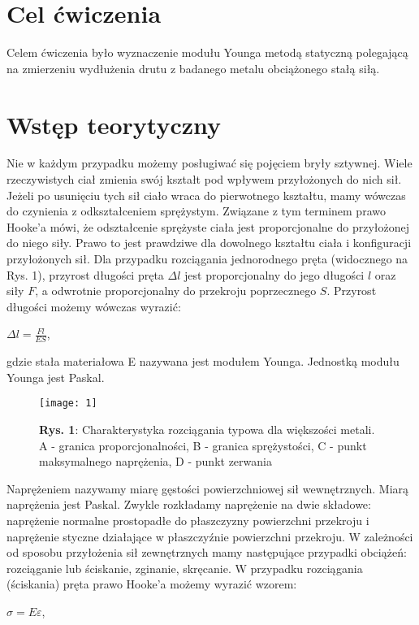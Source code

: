 \documentclass[12pt]{article}
\begin{document}
\tableofcontents \newpage
\section{Cel ćwiczenia}
Celem ćwiczenia było wyznaczenie modułu Younga metodą statyczną polegającą na zmierzeniu wydłużenia drutu z badanego metalu obciążonego stałą siłą.
\section{Wstęp teorytyczny}
\noindent Nie w każdym przypadku możemy posługiwać się pojęciem bryły sztywnej. Wiele rzeczywistych ciał zmienia swój kształt pod wpływem przyłożonych do nich sił. 
Jeżeli po usunięciu tych sił ciało wraca do pierwotnego kształtu, mamy wówczas do czynienia z odkształceniem sprężystym. Związane z tym terminem prawo 
Hooke'a mówi, że odształcenie sprężyste ciała jest proporcjonalne do przyłożonej do niego siły. Prawo to jest prawdziwe dla dowolnego kształtu ciała i konfiguracji 
przyłożonych sił. Dla przypadku rozciągania jednorodnego pręta (widocznego na Rys. 1), przyrost długości pręta $\Delta{l}$ jest proporcjonalny do jego długości 
$l$ oraz siły $F$, a odwrotnie proporcjonalny do przekroju poprzecznego $S$. Przyrost długości możemy wówczas wyrazić: 
\begin{center}
\LARGE $ \Delta{l} = \frac{F l}{E S} $,
\end{center}
gdzie stała materiałowa E nazywana jest modułem Younga. Jednostką modułu Younga jest Paskal. 
\begin{figure}[H]
\centering
\texttt{[image: 1]}
\caption*{\textbf{Rys. 1}: Charakterystyka rozciągania typowa dla większości metali. A - granica proporcjonalności, B - granica sprężystości, 
C - punkt maksymalnego naprężenia, D - punkt zerwania}
\end{figure} \noindent
Naprężeniem nazywamy miarę gęstości powierzchniowej sił wewnętrznych. Miarą naprężenia jest Paskal. Zwykle rozkładamy naprężenie na dwie składowe: naprężenie normalne prostopadłe do płaszczyzny powierzchni przekroju i naprężenie styczne działające w płaszczyźnie powierzchni przekroju.
W zależności od sposobu przyłożenia sił zewnętrznych mamy następujące przypadki obciążeń: rozciąganie lub ściskanie, zginanie, skręcanie. \newpage \noindent
W przypadku rozciągania (ściskania) pręta prawo Hooke'a możemy wyrazić wzorem:
\begin{center}
\LARGE $ \sigma = E \varepsilon $,
\end{center}
\end{document}
